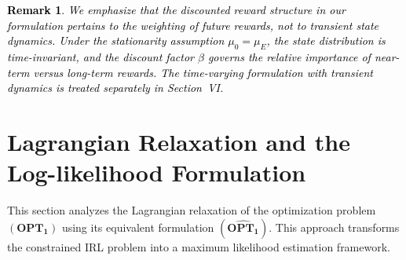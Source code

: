 \documentclass[11pt]{article}
\newcommand{\sX}{{\mathsf X}}
\newcommand{\sA}{{\mathsf A}}
\newcommand{\tb}[1]{\textcolor{black}{#1}} %
\newtheorem{remark}{Remark}
\begin{document}
    

\tb{
\begin{remark}
We emphasize that the discounted \tb{reward} structure in our formulation  pertains to the weighting of future rewards, not to transient state 
dynamics. Under the stationarity assumption $\mu_0 = \mu_E$, the state  distribution is time-invariant, and the discount factor $\beta$ governs  the relative importance of near-term versus long-term rewards. The time-varying formulation with transient dynamics is treated  separately in Section~VI.
\end{remark}
}

\section{Lagrangian Relaxation and the Log-likelihood Formulation}

 

This section analyzes the Lagrangian relaxation of the optimization problem \(\mathbf{(OPT_1)}\) using its equivalent formulation $\mathbf{(\widehat{OPT_1})}$. This approach transforms the constrained IRL problem into a maximum likelihood estimation framework.
\end{document}
